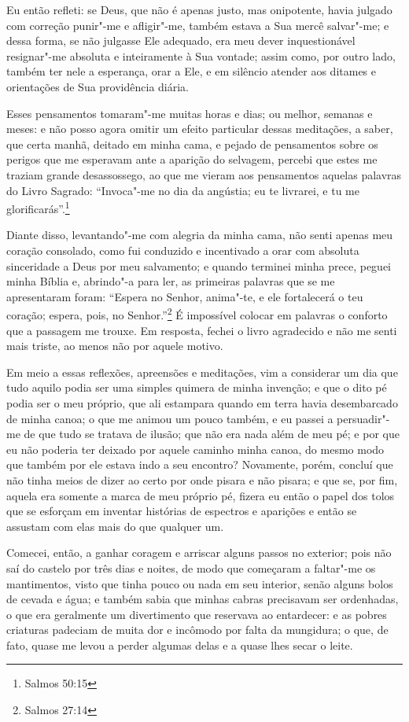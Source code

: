 Eu então refleti: se Deus, que não é apenas justo, mas onipotente, havia
julgado com correção punir"-me e afligir"-me, também estava a Sua mercê
salvar"-me; e dessa forma, se não julgasse Ele adequado, era meu dever
inquestionável resignar"-me absoluta e inteiramente à Sua vontade; assim
como, por outro lado, também ter nele a esperança, orar a Ele, e em
silêncio atender aos ditames e orientações de Sua providência diária.

Esses pensamentos tomaram"-me muitas horas e dias; ou melhor, semanas e
meses: e não posso agora omitir um efeito particular dessas meditações,
a saber, que certa manhã, deitado em minha cama, e pejado de pensamentos
sobre os perigos que me esperavam ante a aparição do selvagem, percebi
que estes me traziam grande desassossego, ao que me vieram aos
pensamentos aquelas palavras do Livro Sagrado: ``Invoca"-me no dia da
angústia; eu te livrarei, e tu me glorificarás''.\footnote{Salmos 50:15}

Diante disso, levantando"-me com alegria da minha cama, não senti apenas
meu coração consolado, como fui conduzido e incentivado a orar com
absoluta sinceridade a Deus por meu salvamento; e quando terminei minha
prece, peguei minha Bíblia e, abrindo"-a para ler, as primeiras palavras
que se me apresentaram foram: ``Espera no Senhor, anima"-te, e ele
fortalecerá o teu coração; espera, pois, no Senhor.''\footnote{Salmos
  27:14} É impossível colocar em palavras o conforto que a passagem me
trouxe. Em resposta, fechei o livro agradecido e não me senti mais
triste, ao menos não por aquele motivo.

Em meio a essas reflexões, apreensões e meditações, vim a considerar um
dia que tudo aquilo podia ser uma simples quimera de minha invenção; e
que o dito pé podia ser o meu próprio, que ali estampara quando em terra
havia desembarcado de minha canoa; o que me animou um pouco também, e eu
passei a persuadir"-me de que tudo se tratava de ilusão; que não era nada
além de meu pé; e por que eu não poderia ter deixado por aquele caminho
minha canoa, do mesmo modo que também por ele estava indo a seu
encontro? Novamente, porém, concluí que não tinha meios de dizer ao
certo por onde pisara e não pisara; e que se, por fim, aquela era
somente a marca de meu próprio pé, fizera eu então o papel dos tolos que
se esforçam em inventar histórias de espectros e aparições e então se
assustam com elas mais do que qualquer um.

Comecei, então, a ganhar coragem e arriscar alguns passos no exterior;
pois não saí do castelo por três dias e noites, de modo que começaram a
faltar"-me os mantimentos, visto que tinha pouco ou nada em seu interior,
senão alguns bolos de cevada e água; e também sabia que minhas cabras
precisavam ser ordenhadas, o que era geralmente um divertimento que
reservava ao entardecer: e as pobres criaturas padeciam de muita dor e
incômodo por falta da mungidura; o que, de fato, quase me levou a perder
algumas delas e a quase lhes secar o leite.

